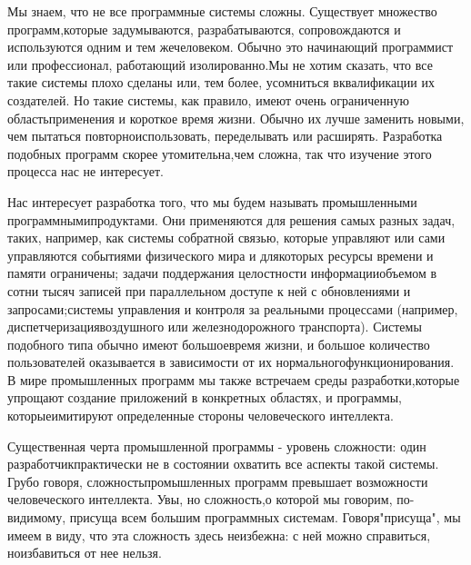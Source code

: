 \documentclass[10pt]{article}
\begin{document}
Мы знаем, что не все программные системы сложны. Существует множество программ,\linebreak  которые задумываются, разрабатываются, сопровождаются и используются одним и тем же\linebreak  человеком. Обычно это начинающий программист или профессионал, работающий изолированно.\linebreak  Мы не хотим сказать, что все такие системы плохо сделаны или, тем более, усомниться в\linebreak  квалификации их создателей. Но такие системы, как правило, имеют очень ограниченную область\linebreak  применения и короткое время жизни. Обычно их лучше заменить новыми, чем пытаться повторно\linebreak  использовать, переделывать или расширять. Разработка подобных программ скорее утомительна,\linebreak  чем сложна, так что изучение этого процесса нас не интересует. 

Нас интересует разработка того, что мы будем называть промышленными программными\linebreak  продуктами. Они применяются для решения самых разных задач, таких, например, как системы с\linebreak  обратной связью, которые управляют или сами управляются событиями физического мира и для\linebreak  которых ресурсы времени и памяти ограничены; задачи поддержания целостности информации\linebreak  объемом в сотни тысяч записей при параллельном доступе к ней с обновлениями и запросами;\linebreak  системы управления и контроля за реальными процессами (например, диспетчеризация\linebreak  воздушного или железнодорожного транспорта). Системы подобного типа обычно имеют большое\linebreak  время жизни, и большое количество пользователей оказывается в зависимости от их нормального\linebreak  функционирования. В мире промышленных программ мы также встречаем среды разработки,\linebreak  которые упрощают создание приложений в конкретных областях, и программы, которые\linebreak  имитируют определенные стороны человеческого интеллекта. 

Существенная черта промышленной программы - уровень сложности: один разработчик\linebreak  практически не в состоянии охватить все аспекты такой системы. Грубо говоря, сложность\linebreak  промышленных программ превышает возможности человеческого интеллекта. Увы, но сложность,\linebreak  о которой мы говорим, по-видимому, присуща всем большим программных системам. Говоря\linebreak  "присуща", мы имеем в виду, что эта сложность здесь неизбежна: с ней можно справиться, но\linebreak  избавиться от нее нельзя. 
\end{document}
